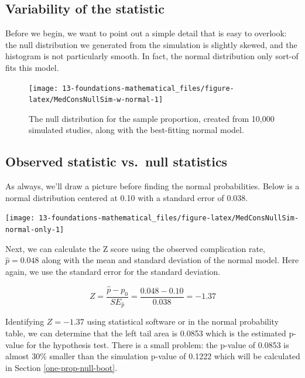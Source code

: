 \documentclass[
  10pt,
  openany]{book}
\begin{document}
\hypertarget{variability-of-the-statistic-5}{%
\subsection{Variability of the statistic}\label{variability-of-the-statistic-5}}

Before we begin, we want to point out a simple detail that is easy to overlook: the null distribution we generated from the simulation is slightly skewed, and the histogram is not particularly smooth.
In fact, the normal distribution only sort-of fits this model.

\begin{figure}[h]

{\centering \texttt{[image: 13-foundations-mathematical\_files/figure-latex/MedConsNullSim-w-normal-1]} 

}

\caption{The null distribution for the sample proportion, created from 10,000 simulated studies, along with the best-fitting normal model.}\label{fig:MedConsNullSim-w-normal}
\end{figure}

\hypertarget{observed-statistic-vs.-null-statistics-3}{%
\subsection{Observed statistic vs.~null statistics}\label{observed-statistic-vs.-null-statistics-3}}

As always, we'll draw a picture before finding the normal probabilities.
Below is a normal distribution centered at 0.10 with a standard error of 0.038.

\begin{center}\texttt{[image: 13-foundations-mathematical\_files/figure-latex/MedConsNullSim-normal-only-1]} \end{center}

Next, we can calculate the Z score using the observed complication rate, \(\hat{p} = 0.048\) along with the mean and standard deviation of the normal model.
Here again, we use the standard error for the standard deviation.

\[Z = \frac{\hat{p} - p_0}{SE_{\hat{p}}} = \frac{0.048 - 0.10}{0.038} = -1.37\]

Identifying \(Z = -1.37\) using statistical software or in the normal probability table, we can determine that the left tail area is 0.0853 which is the estimated p-value for the hypothesis test.
There is a small problem: the p-value of 0.0853 is almost 30\% smaller than the simulation p-value of 0.1222 which will be calculated in Section \ref{one-prop-null-boot}.
\end{document}
